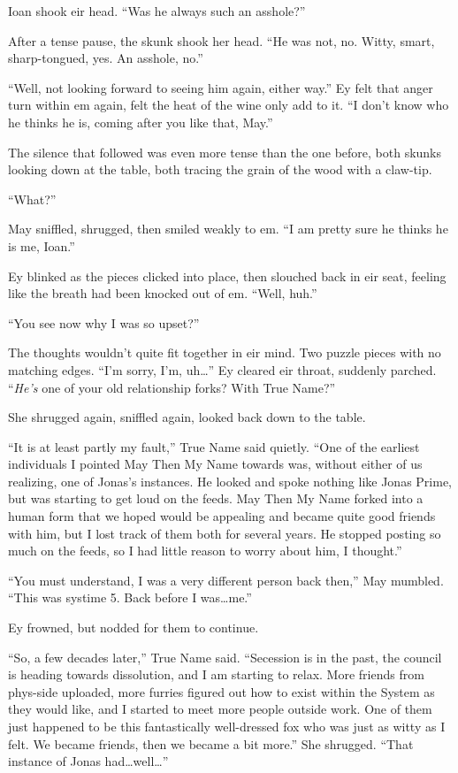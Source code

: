 Ioan shook eir head. ``Was he always such an asshole?''

After a tense pause, the skunk shook her head. ``He was not, no. Witty, smart, sharp-tongued, yes. An asshole, no.''

``Well, not looking forward to seeing him again, either way.'' Ey felt that anger turn within em again, felt the heat of the wine only add to it. ``I don't know who he thinks he is, coming after you like that, May.''

The silence that followed was even more tense than the one before, both skunks looking down at the table, both tracing the grain of the wood with a claw-tip.

``What?''

May sniffled, shrugged, then smiled weakly to em. ``I am pretty sure he thinks he is me, Ioan.''

Ey blinked as the pieces clicked into place, then slouched back in eir seat, feeling like the breath had been knocked out of em. ``Well, huh.''

``You see now why I was so upset?''

The thoughts wouldn't quite fit together in eir mind. Two puzzle pieces with no matching edges. ``I'm sorry, I'm, uh\ldots{}'' Ey cleared eir throat, suddenly parched. ``\emph{He's} one of your old relationship forks? With True Name?''

She shrugged again, sniffled again, looked back down to the table.

``It is at least partly my fault,'' True Name said quietly. ``One of the earliest individuals I pointed May Then My Name towards was, without either of us realizing, one of Jonas's instances. He looked and spoke nothing like Jonas Prime, but was starting to get loud on the feeds. May Then My Name forked into a human form that we hoped would be appealing and became quite good friends with him, but I lost track of them both for several years. He stopped posting so much on the feeds, so I had little reason to worry about him, I thought.''

``You must understand, I was a very different person back then,'' May mumbled. ``This was systime 5. Back before I was\ldots me.''

Ey frowned, but nodded for them to continue.

``So, a few decades later,'' True Name said. ``Secession is in the past, the council is heading towards dissolution, and I am starting to relax. More friends from phys-side uploaded, more furries figured out how to exist within the System as they would like, and I started to meet more people outside work. One of them just happened to be this fantastically well-dressed fox who was just as witty as I felt. We became friends, then we became a bit more.'' She shrugged. ``That instance of Jonas had\ldots well\ldots{}''


